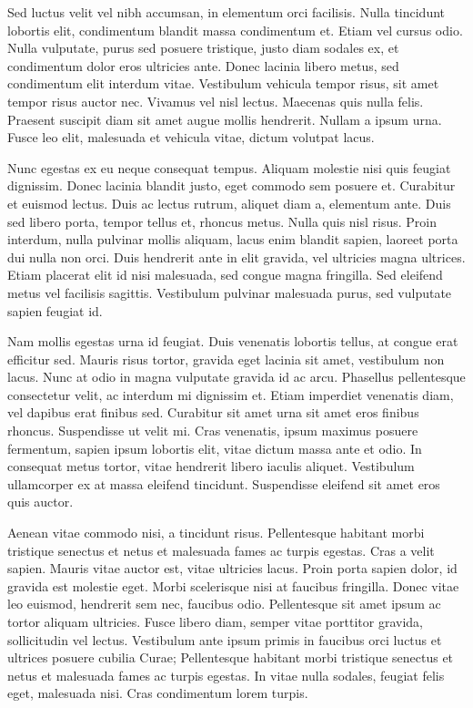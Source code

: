 \documentclass[a4paper,
	11pt,
	parskip=full,
	bibliography=totoc,
	twoside
	]{scrartcl}
\begin{document}
	Sed luctus velit vel nibh accumsan, in elementum orci facilisis. Nulla tincidunt lobortis elit, condimentum blandit massa condimentum et. Etiam vel cursus odio. Nulla vulputate, purus sed posuere tristique, justo diam sodales ex, et condimentum dolor eros ultricies ante. Donec lacinia libero metus, sed condimentum elit interdum vitae. Vestibulum vehicula tempor risus, sit amet tempor risus auctor nec. Vivamus vel nisl lectus. Maecenas quis nulla felis. Praesent suscipit diam sit amet augue mollis hendrerit. Nullam a ipsum urna. Fusce leo elit, malesuada et vehicula vitae, dictum volutpat lacus.
	
	Nunc egestas ex eu neque consequat tempus. Aliquam molestie nisi quis feugiat dignissim. Donec lacinia blandit justo, eget commodo sem posuere et. Curabitur et euismod lectus. Duis ac lectus rutrum, aliquet diam a, elementum ante. Duis sed libero porta, tempor tellus et, rhoncus metus. Nulla quis nisl risus. Proin interdum, nulla pulvinar mollis aliquam, lacus enim blandit sapien, laoreet porta dui nulla non orci. Duis hendrerit ante in elit gravida, vel ultricies magna ultrices. Etiam placerat elit id nisi malesuada, sed congue magna fringilla. Sed eleifend metus vel facilisis sagittis. Vestibulum pulvinar malesuada purus, sed vulputate sapien feugiat id.
	
	Nam mollis egestas urna id feugiat. Duis venenatis lobortis tellus, at congue erat efficitur sed. Mauris risus tortor, gravida eget lacinia sit amet, vestibulum non lacus. Nunc at odio in magna vulputate gravida id ac arcu. Phasellus pellentesque consectetur velit, ac interdum mi dignissim et. Etiam imperdiet venenatis diam, vel dapibus erat finibus sed. Curabitur sit amet urna sit amet eros finibus rhoncus. Suspendisse ut velit mi. Cras venenatis, ipsum maximus posuere fermentum, sapien ipsum lobortis elit, vitae dictum massa ante et odio. In consequat metus tortor, vitae hendrerit libero iaculis aliquet. Vestibulum ullamcorper ex at massa eleifend tincidunt. Suspendisse eleifend sit amet eros quis auctor.
	
	Aenean vitae commodo nisi, a tincidunt risus. Pellentesque habitant morbi tristique senectus et netus et malesuada fames ac turpis egestas. Cras a velit sapien. Mauris vitae auctor est, vitae ultricies lacus. Proin porta sapien dolor, id gravida est molestie eget. Morbi scelerisque nisi at faucibus fringilla. Donec vitae leo euismod, hendrerit sem nec, faucibus odio. Pellentesque sit amet ipsum ac tortor aliquam ultricies. Fusce libero diam, semper vitae porttitor gravida, sollicitudin vel lectus. Vestibulum ante ipsum primis in faucibus orci luctus et ultrices posuere cubilia Curae; Pellentesque habitant morbi tristique senectus et netus et malesuada fames ac turpis egestas. In vitae nulla sodales, feugiat felis eget, malesuada nisi. Cras condimentum lorem turpis.
	
\end{document}
